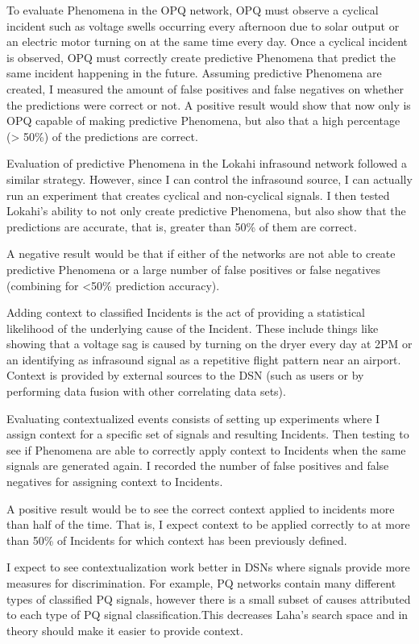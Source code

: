 To evaluate Phenomena in the OPQ network, OPQ must observe a cyclical incident such as voltage swells occurring every afternoon due to solar output or an electric motor turning on at the same time every day. Once a cyclical incident is observed, OPQ must correctly create predictive Phenomena that predict the same incident happening in the future. Assuming predictive Phenomena are created, I measured the amount of false positives and false negatives on whether the predictions were correct or not. A positive result would show that now only is OPQ capable of making predictive Phenomena, but also that a high percentage (> 50\%) of the predictions are correct.

Evaluation of predictive Phenomena in the Lokahi infrasound network followed a similar strategy. However, since I can control the infrasound source, I can actually run an experiment that creates cyclical and non-cyclical signals. I then tested Lokahi's ability to not only create predictive Phenomena, but also show that the predictions are accurate, that is, greater than 50\% of them are correct.

A negative result would be that if either of the networks are not able to create predictive Phenomena or a large number of false positives or false negatives (combining for <50\% prediction accuracy).

Adding context to classified Incidents is the act of providing a statistical likelihood of the underlying cause of the Incident. These include things like showing that a voltage sag is caused by turning on the dryer every day at 2PM or an identifying as infrasound signal as a repetitive flight pattern near an airport. Context is provided by external sources to the DSN (such as users or by performing data fusion with other correlating data sets).

Evaluating contextualized events consists of setting up experiments where I assign context for a specific set of signals and resulting Incidents. Then testing to see if Phenomena are able to correctly apply context to Incidents when the same signals are generated again. I recorded the number of false positives and false negatives for assigning context to Incidents.

A positive result would be to see the correct context applied to incidents more than half of the time. That is, I expect context to be applied correctly to at more than 50\% of Incidents for which context has been previously defined.

I expect to see contextualization work better in DSNs where signals provide more measures for discrimination. For example, PQ networks contain many different types of classified PQ signals, however there is a small subset of causes attributed to each type of PQ signal classification.This decreases Laha's search space and in theory should make it easier to provide context.

